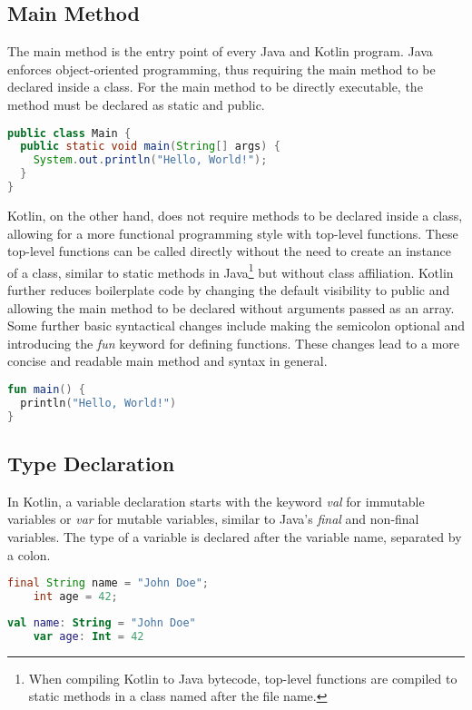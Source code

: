 \documentclass[a4paper, 11pt]{article}
\begin{document}
\subsection{Main Method}
  The main method is the entry point of every Java and Kotlin program.
  Java enforces object-oriented programming, thus requiring the main method to be declared inside a class.
  For the main method to be directly executable, the method must be declared as static and public.
  \begin{lstlisting}[language=Java,title={Java main method}]
public class Main {
  public static void main(String[] args) {
    System.out.println("Hello, World!");
  }
}
\end{lstlisting}
  Kotlin, on the other hand, does not require methods to be declared inside a class, allowing for a more functional programming style with top-level functions.
  These top-level functions can be called directly without the need to create an instance of a class, similar to static methods in Java\footnote{When compiling Kotlin to Java bytecode, top-level functions are compiled to static methods in a class named after the file name.} but without class affiliation.
  Kotlin further reduces boilerplate code by changing the default visibility to public and allowing the main method to be declared without arguments passed as an array.
  Some further basic syntactical changes include making the semicolon optional and introducing the \textit{fun} keyword for defining functions.
  These changes lead to a more concise and readable main method and syntax in general.
\begin{lstlisting}[language=Kotlin,title={Kotlin main method}]
fun main() {
  println("Hello, World!")
}
\end{lstlisting}

\subsection{Type Declaration}
  In Kotlin, a variable declaration starts with the keyword \textit{val} for immutable variables or \textit{var} for mutable variables, similar to Java's \textit{final} and non-final variables.
  The type of a variable is declared after the variable name, separated by a colon.
\begin{lstlisting}[language=Java,title={Java data types}]
    final String name = "John Doe";
    int age = 42;
  \end{lstlisting}
  \begin{lstlisting}[language=Kotlin,title={Kotlin data types}]
    val name: String = "John Doe"
    var age: Int = 42
  \end{lstlisting}
\end{document}
